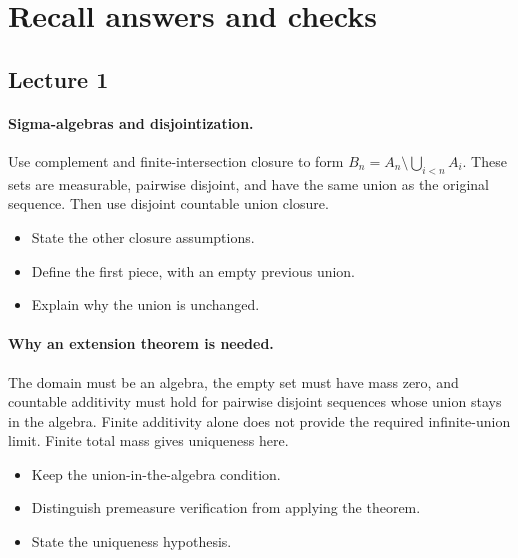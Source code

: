 \documentclass[11pt,letterpaper]{article}
\begin{document}
\clearpage\section{Recall answers and checks}
\subsection{Lecture 1}
\hypertarget{answer-l1-s2}{}\paragraph{Sigma-algebras and disjointization.}
Use complement and finite-intersection closure to form $B_n=A_n\setminus\bigcup_{i<n}A_i$. These sets are measurable, pairwise disjoint, and have the same union as the original sequence. Then use disjoint countable union closure.
\begin{itemize}
\item State the other closure assumptions.
\item Define the first piece, with an empty previous union.
\item Explain why the union is unchanged.
\end{itemize}
\hypertarget{answer-l1-s9}{}\paragraph{Why an extension theorem is needed.}
The domain must be an algebra, the empty set must have mass zero, and countable additivity must hold for pairwise disjoint sequences whose union stays in the algebra. Finite additivity alone does not provide the required infinite-union limit. Finite total mass gives uniqueness here.
\begin{itemize}
\item Keep the union-in-the-algebra condition.
\item Distinguish premeasure verification from applying the theorem.
\item State the uniqueness hypothesis.
\end{itemize}
\end{document}
